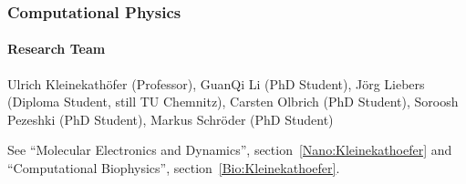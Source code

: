 \subsubsection{Computational Physics}
 \label{Nano:Kleinekathoefer}

\paragraph{Research Team}
Ulrich Kleinekath\"ofer (Professor), GuanQi Li (PhD Student), J\"org
Liebers (Diploma Student, still TU Chemnitz), Carsten Olbrich (PhD
Student), Soroosh Pezeshki (PhD Student), Markus Schr\"oder (PhD
Student)

\vspace{1em}

See ``Molecular Electronics and Dynamics'',
section~\ref{Nano:Kleinekathoefer} and ``Computational Biophysics'',
section~\ref{Bio:Kleinekathoefer}.
